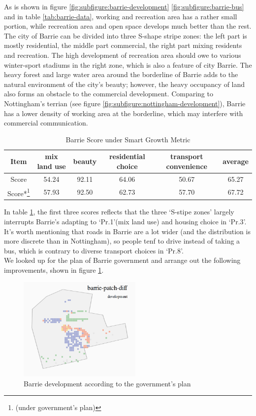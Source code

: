 As is shown in figure \ref{fig:subfigure:barrie-development} \ref{fig:subfigure:barrie-bus} and in table \ref{tab:barrie-data}, working and recreation area has a rather small portion, while recreation area and open space develops much better than the rest.
The city of Barrie can be divided into three S-shape stripe zones: the left part is mostly residential, the middle part commercial, the right part mixing residents and recreation.
The high development of recreation area should owe to various winter-sport stadiums in the right zone, which is also a feature of city Barrie.
The heavy forest and large water area around the borderline of Barrie adds to the natural environment of the city's beauty; however, the heavy occupancy of land also forms an obstacle to the commercial development.
Comparing to Nottingham's terrian (see figure \ref{fig:subfigure:nottingham-development}), Barrie has a lower density of working area at the borderline, which may interfere with commercial communication.
\\
\begin{table}[tb]
\centering
  \begin{tabular}{c|cccc|c}
    \hline
    Item & mix land use & beauty & residential choice & transport convenience & average \\
    \hline
    Score & 54.24 & 92.11 & 64.06 & 50.67 & 65.27 \\
    Score*\footnote{(under government's plan)} & 57.93 & 92.50 & 62.73 & 57.70 & 67.72\\
    \hline
  \end{tabular}
  \caption{Barrie Score under Smart Growth Metric}
  \label{tab:barrie-score}
\end{table}
In table \ref{tab:barrie-score}, the first three scores reflects that the three `S-stipe zones' largely interrupts Barrie's adapting to `Pr.1'(mix land use) and housing choice in `Pr.3'.
It's worth mentioning that roads in Barrie are a lot wider (and the distribution is more discrete than in Nottingham), so people tenf to drive instead of taking a bus, which is contrary to diverse transport choices in `Pr.8'.
\\
We looked up for the plan of Barrie government \cite{pdf:barrie-downtown-plan} \cite{pdf:barrie-waterfront} \cite{pdf:barrie-official-plan} \cite{pdf:barrie-industrial-mapping} and arrange out the following improvements, shown in figure \ref{fig:barrie-patch-diff}.
\begin{figure}[htb]
  \label{fig:barrie-patch-diff}
  \centering
  \includegraphics[width=6cm]{pic/barrie-patch-diff-development.png}
  \caption{Barrie development according to the government's plan}
\end{figure}
